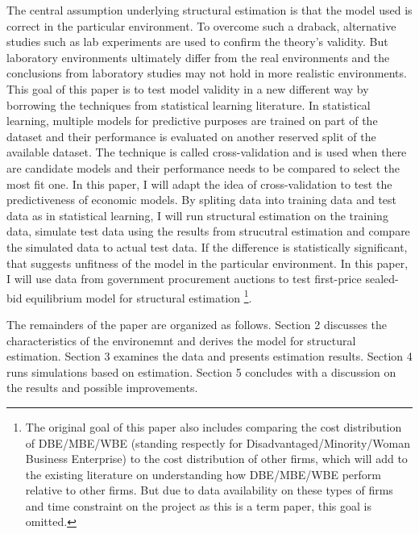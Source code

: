 \documentclass[11pt]{article}
\begin{document}
The central assumption underlying structural estimation is that the model used 
is correct in the particular environment. To overcome such a draback, alternative 
studies such as lab experiments are used to confirm the theory's validity. But 
laboratory environments ultimately differ from the real environments and 
the conclusions from laboratory studies may not hold in more realistic environments. 
This goal of this paper is to test model validity in a new different way by 
borrowing the techniques from statistical learning literature. In statistical 
learning, multiple models for predictive purposes are trained on part of the dataset 
and their performance is evaluated on another reserved split of 
the available dataset. The technique is called cross-validation 
and is used when there are candidate models and their performance needs to 
be compared to select the most fit one. In this paper, I will adapt the idea 
of cross-validation to test the predictiveness of economic models. By spliting 
data into training data and test data as in statistical learning, I will 
run structural estimation on the training data, simulate test data using the 
results from strucutral estimation and compare the simulated data to actual 
test data. If the difference is statistically significant, that suggests 
unfitness of the model in the particular environment. 
In this paper, I will use data from government procurement auctions to test 
first-price sealed-bid equilibrium model \cite{RileySamuelson1981} 
for structural estimation
\footnote{The original goal of this paper also includes comparing the cost 
distribution of DBE/MBE/WBE (standing respectly for Disadvantaged/Minority/Woman
Business Enterprise) to the cost distribution of other firms, which will add 
to the existing literature on understanding how DBE/MBE/WBE perform relative 
to other firms. But due to data availability on these types of firms 
and time constraint on the project as this is a 
term paper, this goal is omitted. }.


The remainders of the paper are organized as follows. Section 2 discusses the 
characteristics of the environemnt and derives the model for structural 
estimation. Section 3 examines the data and presents estimation results. 
Section 4 runs simulations based on estimation. Section 5 concludes with 
a discussion on the results and possible improvements. 
\end{document}
